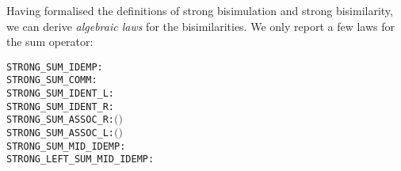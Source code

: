 Having formalised the definitions of strong bisimulation and strong bisimilarity,
we can derive \emph{algebraic laws} for the 
 bisimilarities. We only report a few laws for the sum operator:
\begin{alltt}
STRONG_SUM_IDEMP:          \HOLTokenTurnstile{}  \HOLSymConst{\ensuremath{+}}  \HOLSymConst{\HOLTokenStrongEQ}   
STRONG_SUM_COMM:           \HOLTokenTurnstile{}  \HOLSymConst{\ensuremath{+}}  \HOLSymConst{\HOLTokenStrongEQ}  \HOLSymConst{\ensuremath{+}} 
STRONG_SUM_IDENT_L:        \HOLTokenTurnstile{}  \HOLSymConst{\ensuremath{+}}  \HOLSymConst{\HOLTokenStrongEQ} 
STRONG_SUM_IDENT_R:        \HOLTokenTurnstile{}  \HOLSymConst{\ensuremath{+}}  \HOLSymConst{\HOLTokenStrongEQ} 
STRONG_SUM_ASSOC_R:        \HOLTokenTurnstile{}  \HOLSymConst{\ensuremath{+}}  \HOLSymConst{\ensuremath{+}}  \HOLSymConst{\HOLTokenStrongEQ}  \HOLSymConst{\ensuremath{+}} \ensuremath{(} \HOLSymConst{\ensuremath{+}} \ensuremath{)}
STRONG_SUM_ASSOC_L:        \HOLTokenTurnstile{}  \HOLSymConst{\ensuremath{+}} \ensuremath{(} \HOLSymConst{\ensuremath{+}} \ensuremath{)} \HOLSymConst{\HOLTokenStrongEQ}  \HOLSymConst{\ensuremath{+}}  \HOLSymConst{\ensuremath{+}} 
STRONG_SUM_MID_IDEMP:      \HOLTokenTurnstile{}  \HOLSymConst{\ensuremath{+}}  \HOLSymConst{\ensuremath{+}}  \HOLSymConst{\HOLTokenStrongEQ}  \HOLSymConst{\ensuremath{+}} 
STRONG_LEFT_SUM_MID_IDEMP: \HOLTokenTurnstile{}  \HOLSymConst{\ensuremath{+}}  \HOLSymConst{\ensuremath{+}}  \HOLSymConst{\ensuremath{+}}  \HOLSymConst{\HOLTokenStrongEQ}  \HOLSymConst{\ensuremath{+}}  \HOLSymConst{\ensuremath{+}} 
\end{alltt}

